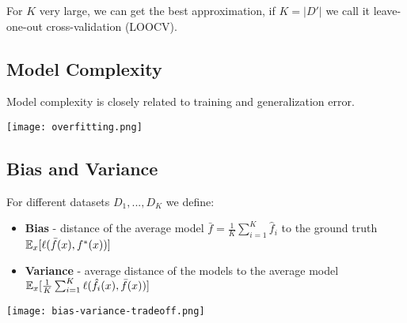 For $K$ very large, we can get the best approximation, if $K = |D'|$ we call it leave-one-out cross-validation (LOOCV).

\subsection{Model Complexity}

Model complexity is closely related to training and generalization error.

\texttt{[image: overfitting.png]}

\subsection{Bias and Variance}

For different datasets $D_1,...,D_K$ we define:
\begin{itemize}
	\item \textbf{Bias} - distance of the average model $\bar{f} = \frac{1}{K} \sum_{i=1}^K \hat{f}_i$ to the ground truth $\mathbb{E}_x[\ell(\bar{f}(x), f^*(x))]$
	\item \textbf{Variance} - average distance of the models to the average model $\mathbb{E}_x[\frac{1}{K} \sum_{i=1}^K \ell(\hat{f}_i(x), \bar{f}(x))]$
\end{itemize}

\begin{center}
	\texttt{[image: bias-variance-tradeoff.png]}
\end{center}